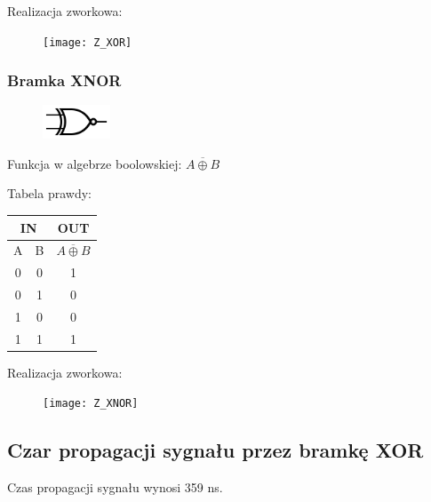 \documentclass[a4paper,12pt]{article}
\begin{document}
\begin{justify}
Realizacja zworkowa:

\begin{figure}[h!]
\centering
\texttt{[image: Z\_XOR]}
\end{figure}

\newpage

\subsubsection{Bramka XNOR}

\begin{figure}[h!]
\centering
\includegraphics[width=2cm, height=1cm]{XNOR}
\end{figure}

Funkcja w algebrze boolowskiej: $\overline{A \oplus B}$

Tabela prawdy:

\begin{table}[h!]
\begin{center}
\begin{scriptsize}
\begin{tabular}{|c|c|c|}
\hline
\multicolumn{2}{|c}{IN} & OUT  \\
\hline
A & B & $\overline{A \oplus B}$ \\
\hline
0 & 0 & 1 \\
0 & 1 & 0 \\
1 & 0 & 0 \\
1 & 1 & 1 \\
\hline
\end{tabular}
\end{scriptsize}
\end{center}
\end{table}

Realizacja zworkowa:

\begin{figure}[h!]
\centering
\texttt{[image: Z\_XNOR]}
\end{figure}

\subsection{Czar propagacji sygnału przez bramkę XOR}

Czas propagacji sygnału wynosi 359 ns.


\end{justify}
\end{document}
